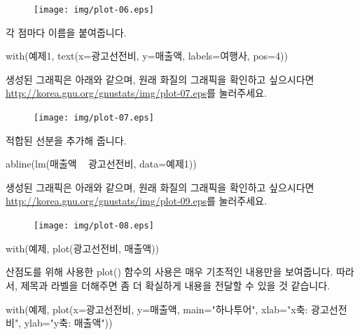 \begin{figure}
\begin{center}
\texttt{[image: img/plot-06.eps]}
\end{center}
\end{figure}

각 점마다 이름을 붙여줍니다.
\begin{Schunk}
\begin{Soutput}	
with(예제1, text(x=광고선전비, y=매출액, labels=여행사, pos=4))
\end{Soutput}
\end{Schunk}
생성된 그래픽은 아래와 같으며, 원래 화질의 그래픽을 확인하고 싶으시다면 \href{http://korea.gnu.org/gnustats/img/plot-07.eps}{http://korea.gnu.org/gnustats/img/plot-07.eps}를 눌러주세요. 

\begin{figure}
\begin{center}
\texttt{[image: img/plot-07.eps]}
\end{center}
\end{figure}

적합된 선분을 추가해 줍니다. 
\begin{Schunk}
\begin{Soutput}	
abline(lm(매출액 ~ 광고선전비, data=예제1))
\end{Soutput}
\end{Schunk}
생성된 그래픽은 아래와 같으며, 원래 화질의 그래픽을 확인하고 싶으시다면 \href{http://korea.gnu.org/gnustats/img/plot-08.eps}{http://korea.gnu.org/gnustats/img/plot-09.eps}를 눌러주세요. 

\begin{figure}
\begin{center}
\texttt{[image: img/plot-08.eps]}
\end{center}
\end{figure}

\begin{Schunk}
\begin{Soutput}
with(예제, plot(광고선전비, 매출액))
\end{Soutput}
\end{Schunk}

산점도를 위해 사용한 plot() 함수의 사용은 매우 기초적인 내용만을 보여줍니다. 
따라서, 제목과 라벨을 더해주면 좀 더 확실하게 내용을 전달할 수 있을 것 같습니다. 

\begin{Schunk}
\begin{Soutput}
with(예제, plot(x=광고선전비, y=매출액, main="하나투어", xlab="x축: 광고선전비", ylab="y축: 매출액"))
\end{Soutput}
\end{Schunk}



